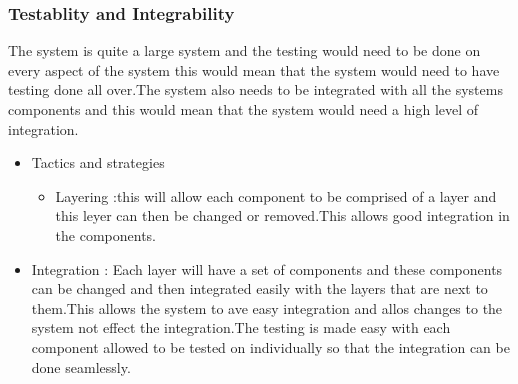 \subsubsection{Testablity and Integrability}
\begin{flushleft}
The system is quite a large system and the testing would need to be done on every aspect of the system this would mean that the system would need to have testing done all over.The system also needs to be integrated with all the systems components and this would mean that the system would need a high level of integration.
\begin{itemize}
\item{Tactics and strategies}
\begin{itemize}
\item{Layering} :this will allow each component to be comprised of a layer and this leyer can then be changed or removed.This allows good integration in the components.

\end{itemize}

\item{Integration} :
Each layer will have a set of components and these components can be changed and then integrated easily with the layers that are next to them.This allows the system to ave easy integration and allos changes to the system not effect the integration.The testing is made easy with each component allowed to be tested on individually so that the integration can be done seamlessly.
\end{itemize}

\end{flushleft}
		